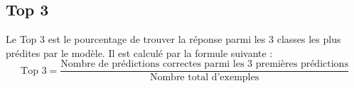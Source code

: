 \subsection{Top 3}
Le Top 3 est le pourcentage de trouver la réponse parmi les 3 classes les plus prédites par le modèle. Il est calculé par la formule suivante :
\begin{equation}
    \text{Top 3} = \frac{\text{Nombre de prédictions correctes parmi les 3 premières prédictions}}{\text{Nombre total d'exemples}}
\end{equation}
